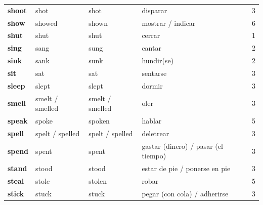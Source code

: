 \documentclass[11pt,a4paper]{article}
\begin{document}
\begin{longtable}{>{\bfseries}p{2.6cm}p{3.4cm}p{3.6cm}>{\raggedright\arraybackslash}p{6.0cm}c}
\textcolor{verdeO}{shoot} & \textcolor{verdeO}{shot} & \textcolor{verdeO}{shot} & \textcolor{verdeO}{disparar} & \textcolor{verdeO}{3}\\
\textcolor{rosaO}{show} & \textcolor{rosaO}{showed} & \textcolor{rosaO}{shown} & \textcolor{rosaO}{mostrar / indicar} & \textcolor{rosaO}{6}\\
\textcolor{amarilloO}{shut} & \textcolor{amarilloO}{shut} & \textcolor{amarilloO}{shut} & \textcolor{amarilloO}{cerrar} & \textcolor{amarilloO}{1}\\
\textcolor{naranjaO}{sing} & \textcolor{naranjaO}{sang} & \textcolor{naranjaO}{sung} & \textcolor{naranjaO}{cantar} & \textcolor{naranjaO}{2}\\
\textcolor{naranjaO}{sink} & \textcolor{naranjaO}{sank} & \textcolor{naranjaO}{sunk} & \textcolor{naranjaO}{hundir(se)} & \textcolor{naranjaO}{2}\\
\textcolor{verdeO}{sit} & \textcolor{verdeO}{sat} & \textcolor{verdeO}{sat} & \textcolor{verdeO}{sentarse} & \textcolor{verdeO}{3}\\
\textcolor{verdeO}{sleep} & \textcolor{verdeO}{slept} & \textcolor{verdeO}{slept} & \textcolor{verdeO}{dormir} & \textcolor{verdeO}{3}\\
\textcolor{verdeO}{smell} & \textcolor{verdeO}{smelt / smelled} & \textcolor{verdeO}{smelt / smelled} & \textcolor{verdeO}{oler} & \textcolor{verdeO}{3}\\
\textcolor{rojoO}{speak} & \textcolor{rojoO}{spoke} & \textcolor{rojoO}{spoken} & \textcolor{rojoO}{hablar} & \textcolor{rojoO}{5}\\
\textcolor{verdeO}{spell} & \textcolor{verdeO}{spelt / spelled} & \textcolor{verdeO}{spelt / spelled} & \textcolor{verdeO}{deletrear} & \textcolor{verdeO}{3}\\
\textcolor{verdeO}{spend} & \textcolor{verdeO}{spent} & \textcolor{verdeO}{spent} & \textcolor{verdeO}{gastar (dinero) / pasar (el tiempo)} & \textcolor{verdeO}{3}\\
\textcolor{verdeO}{stand} & \textcolor{verdeO}{stood} & \textcolor{verdeO}{stood} & \textcolor{verdeO}{estar de pie / ponerse en pie} & \textcolor{verdeO}{3}\\
\textcolor{rojoO}{steal} & \textcolor{rojoO}{stole} & \textcolor{rojoO}{stolen} & \textcolor{rojoO}{robar} & \textcolor{rojoO}{5}\\
\textcolor{verdeO}{stick} & \textcolor{verdeO}{stuck} & \textcolor{verdeO}{stuck} & \textcolor{verdeO}{pegar (con cola) / adherirse} & \textcolor{verdeO}{3}\\

\end{longtable}
\end{document}
